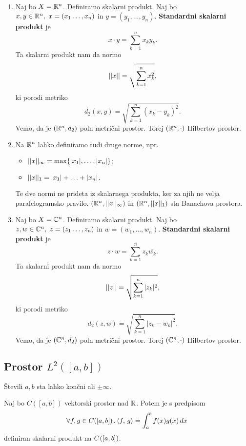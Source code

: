 \newpage
\begin{zgled} \
\begin{enumerate}
    \item Naj bo \(X = \mathbb{R}^n\). Definiramo skalarni produkt. Naj bo \(x, y \in \mathbb{R}^n, \ x = (x_1 \ldots, x_n)\) in \(y = (y_1, \ldots, y_n)\). \textbf{Standardni skalarni produkt} je \[x \cdot y = \sum_{k=1}^{n} x_ky_k.\]
    Ta skalarni produkt nam da normo \[||x|| = \sqrt{\sum_{k=1}^{n} x_k^2},\]
    ki porodi metriko \[d_2(x,y) = \sqrt{\sum_{k=1}^{n} (x_k - y_k)^2}.\]
    Vemo, da je \((\mathbb{R}^n, d_2)\) poln metrični prostor. Torej \((\mathbb{R}^n, \cdot)\) Hilbertov prostor.
    \item Na \(\mathbb{R}^n\) lahko definiramo tudi druge norme, npr.
    \begin{itemize}
        \item \(||x||_\infty = \max \{|x_1|, \ldots, |x_n|\}\);
        \item \(||x||_1 = |x_1| + \ldots + |x_n|\). 
    \end{itemize}
    Te dve normi ne prideta iz skalarnega produkta, ker za njih ne velja paralelogramsko pravilo.
    \((\mathbb{R}^n, ||x||_\infty)\) in \((\mathbb{R}^n, ||x||_1)\) sta Banachova prostora.
    \item Naj bo \(X = \mathbb{C}^n\). Definiramo skalarni produkt. Naj bo \(z, w \in \mathbb{C}^n, \ z = (z_1 \ldots, z_n)\) in \(w = (w_1, \ldots, w_n)\). \textbf{Standardni skalarni produkt} je \[z \cdot w = \sum_{k=1}^{n} z_k\overline{w_k}.\]
    Ta skalarni produkt nam da normo \[||z|| = \sqrt{\sum_{k=1}^{n} |z_k|^2},\]
    ki porodi metriko \[d_2(z,w) = \sqrt{\sum_{k=1}^{n} |z_k - w_k|^2}.\]
    Vemo, da je \((\mathbb{C}^n, d_2)\) poln metrični prostor. Torej \((\mathbb{C}^n, \cdot)\) Hilbertov prostor.
\end{enumerate}
\end{zgled}

\subsection{Prostor \(L^2([a, b])\)}
\begin{opomba}
    Števili \(a, b\) sta lahko končni ali \(\pm\infty\).
\end{opomba}
\begin{trditev}
    Naj bo \(C([a,b])\) vektorski prostor nad \(\mathbb{R}\). Potem je s predpisom \[\forall f, g \in C([a,b]) \,.\, \langle f, \, g \rangle = \int_{a}^{b} f(x) g(x) \, dx\]
    definiran skalarni produkt na \(C^{}([a,b])\).
\end{trditev}

